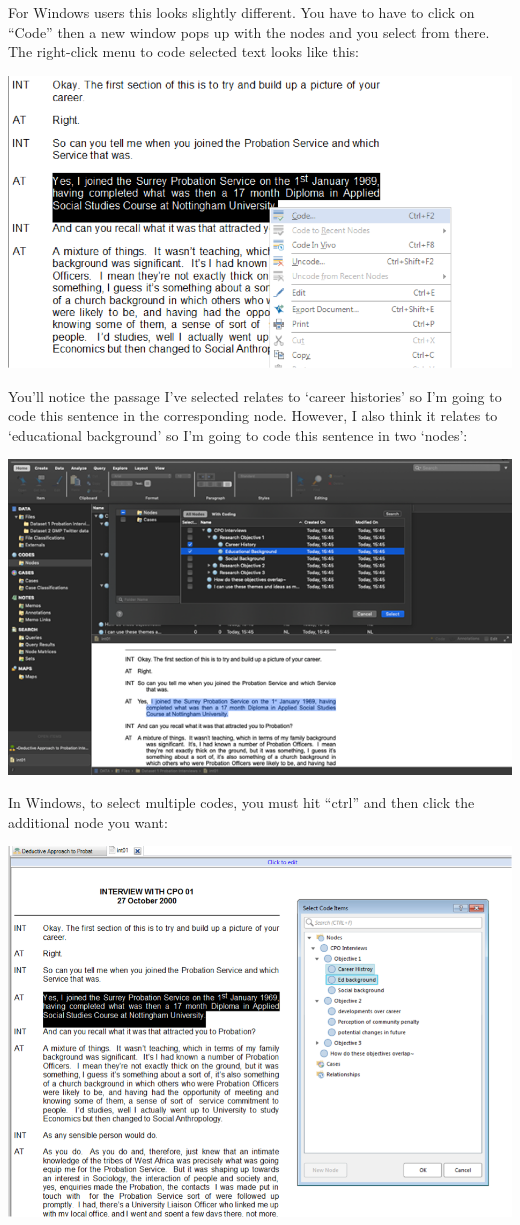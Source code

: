\documentclass[
]{book}
\begin{document}
For Windows users this looks slightly different. You have to have to click on ``Code'' then a new window pops up with the nodes and you select from there. The right-click menu to code selected text looks like this:

\includegraphics{imgs/code_selection_pc.png}

You'll notice the passage I've selected relates to `career histories' so I'm going to code this sentence in the corresponding node. However, I also think it relates to `educational background' so I'm going to code this sentence in two `nodes':

\includegraphics{imgs/two_nodes.png}

In Windows, to select multiple codes, you must hit ``ctrl'' and then click the additional node you want:

\includegraphics{imgs/two_nodes_pc.png}
\end{document}
